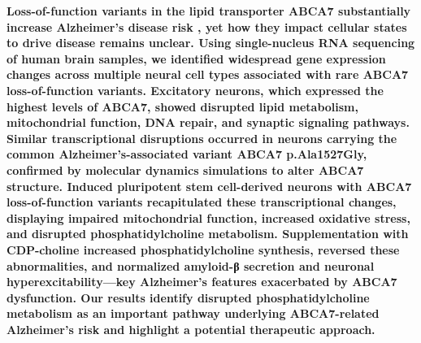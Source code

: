 \textbf{Loss-of-function variants in the lipid transporter ABCA7 substantially increase Alzheimer’s disease risk \supercite{Steinberg2015-vj,Holstege2022-vp}, yet how they impact cellular states to drive disease remains unclear. Using single-nucleus RNA sequencing of human brain samples, we identified widespread gene expression changes across multiple neural cell types associated with rare ABCA7 loss-of-function variants. Excitatory neurons, which expressed the highest levels of ABCA7, showed disrupted lipid metabolism, mitochondrial function, DNA repair, and synaptic signaling pathways. Similar transcriptional disruptions occurred in neurons carrying the common Alzheimer's-associated variant ABCA7 p.Ala1527Gly\supercite{Kunkle2019-yo}, confirmed by molecular dynamics simulations to alter ABCA7 structure. Induced pluripotent stem cell-derived neurons with ABCA7 loss-of-function variants recapitulated these transcriptional changes, displaying impaired mitochondrial function, increased oxidative stress, and disrupted phosphatidylcholine metabolism. Supplementation with CDP-choline increased phosphatidylcholine synthesis, reversed these abnormalities, and normalized amyloid-β secretion and neuronal hyperexcitability—key Alzheimer's features exacerbated by ABCA7 dysfunction. Our results identify disrupted phosphatidylcholine metabolism as an important pathway underlying ABCA7-related Alzheimer’s risk and highlight a potential therapeutic approach.}\\

